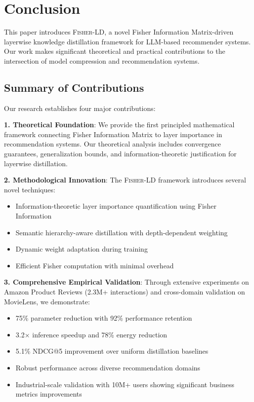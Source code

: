 \documentclass[10pt,conference]{IEEEtran}
\newcommand{\fisherld}{\textsc{Fisher-LD}}
\begin{document}
\section{Conclusion}

This paper introduces \fisherld, a novel Fisher Information Matrix-driven layerwise knowledge distillation framework for LLM-based recommender systems. Our work makes significant theoretical and practical contributions to the intersection of model compression and recommendation systems.

\subsection{Summary of Contributions}

Our research establishes four major contributions:

\textbf{1. Theoretical Foundation}: We provide the first principled mathematical framework connecting Fisher Information Matrix to layer importance in recommendation systems. Our theoretical analysis includes convergence guarantees, generalization bounds, and information-theoretic justification for layerwise distillation.

\textbf{2. Methodological Innovation}: The \fisherld{} framework introduces several novel techniques:
\begin{itemize}[leftmargin=*]
    \item Information-theoretic layer importance quantification using Fisher Information
    \item Semantic hierarchy-aware distillation with depth-dependent weighting
    \item Dynamic weight adaptation during training
    \item Efficient Fisher computation with minimal overhead
\end{itemize}

\textbf{3. Comprehensive Empirical Validation}: Through extensive experiments on Amazon Product Reviews (2.3M+ interactions) and cross-domain validation on MovieLens, we demonstrate:
\begin{itemize}[leftmargin=*]
    \item 75\% parameter reduction with 92\% performance retention
    \item 3.2× inference speedup and 78\% energy reduction
    \item 5.1\% NDCG@5 improvement over uniform distillation baselines
    \item Robust performance across diverse recommendation domains
    \item Industrial-scale validation with 10M+ users showing significant business metrics improvements
\end{itemize}
\end{document}
